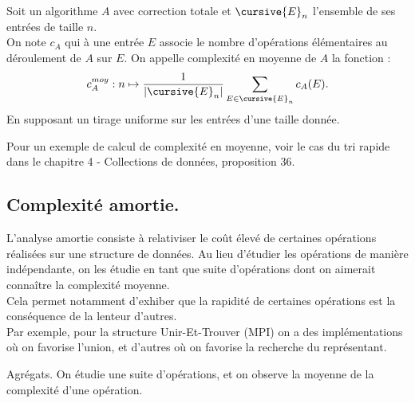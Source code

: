 \documentclass[french, 11pt]{article}
\begin{document}
\begin{defi}{}{}
    Soit un algorithme $A$ avec correction totale et $\cursive{E}_n$ l'ensemble de ses entrées de taille $n$.\\
    On note $c_A$ qui à une entrée $E$ associe le nombre d'opérations élémentaires au déroulement de $A$ sur $E$.
    On appelle complexité en moyenne de $A$ la fonction :
    \begin{equation*}
        c_A^{moy}:n\mapsto \frac{1}{|\cursive{E}_n|}\sum_{E\in\cursive{E}_n}c_A(E).
    \end{equation*}
    En supposant un tirage uniforme sur les entrées d'une taille donnée.
\end{defi}

\begin{ex}{}{}
    Pour un exemple de calcul de complexité en moyenne, voir le cas du tri rapide dans le chapitre 4 - Collections de données, proposition 36.
\end{ex}

\subsection{Complexité amortie.}

\begin{defi}{}{}
    L'analyse amortie consiste à relativiser le coût élevé de certaines opérations réalisées sur une structure de données. Au lieu d'étudier les opérations de manière indépendante, on les étudie en tant que suite d'opérations dont on aimerait connaître la complexité moyenne.\\
    Cela permet notamment d'exhiber que la rapidité de certaines opérations est la conséquence de la lenteur d'autres.\\
    Par exemple, pour la structure Unir-Et-Trouver (MPI) on a des implémentations où on favorise l'union, et d'autres où on favorise la recherche du représentant.
\end{defi}

\begin{meth}{Agrégats.}{}
    On étudie une suite d'opérations, et on observe la moyenne de la complexité d'une opération.
\end{meth}

\pagebreak
\end{document}
